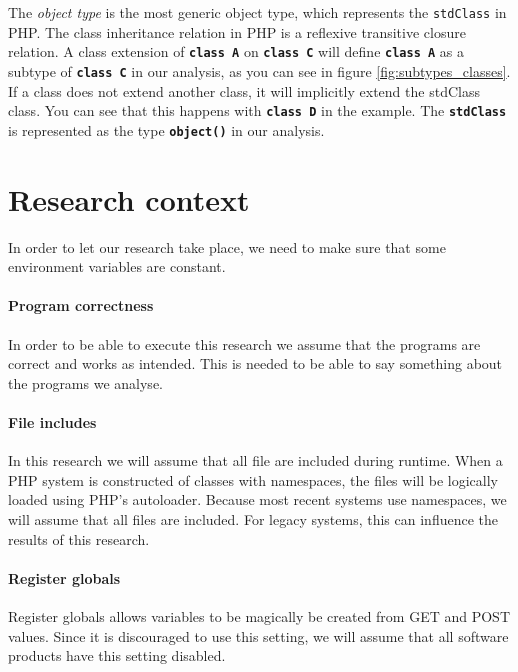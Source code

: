 \documentclass[../main.tex]{subfiles}
\begin{document}
	The \textit{object type} is the most generic object type, which represents the \texttt{stdClass} in PHP.
    The class inheritance relation in PHP is a \gls{reflexive transitive closure} relation.
    A class extension of \textbf{\texttt{class A}} on \textbf{\texttt{class C}} will define \textbf{\texttt{class A}} as a subtype of \textbf{\texttt{class C}} in our analysis, as you can see in figure \ref{fig:subtypes_classes}.
    If a class does not extend another class, it will implicitly extend the \gls{stdClass} class.
    You can see that this happens with \textbf{\texttt{class D}} in the example.
    The \textbf{\texttt{stdClass}} is represented as the type \textbf{\texttt{object()}} in our analysis.

    \section{Research context}\label{sec:research_context}
    In order to let our research take place, we need to make sure that some environment variables are constant.
    
    \paragraph{Program correctness}
    In order to be able to execute this research we assume that the programs are correct and works as intended.
    This is needed to be able to say something about the programs we analyse.
    
    \paragraph{File includes}
    In this research we will assume that all file are included during runtime. 
    When a PHP system is constructed of classes with namespaces, the files will be logically loaded using PHP's autoloader.
    Because most recent systems use namespaces, we will assume that all files are included.
    For legacy systems, this can influence the results of this research.
    
    \paragraph{Register globals}
    Register globals allows variables to be magically be created from GET and POST values.
    Since it is discouraged to use this setting, we will assume that all software products have this setting disabled.
    
\end{document}
